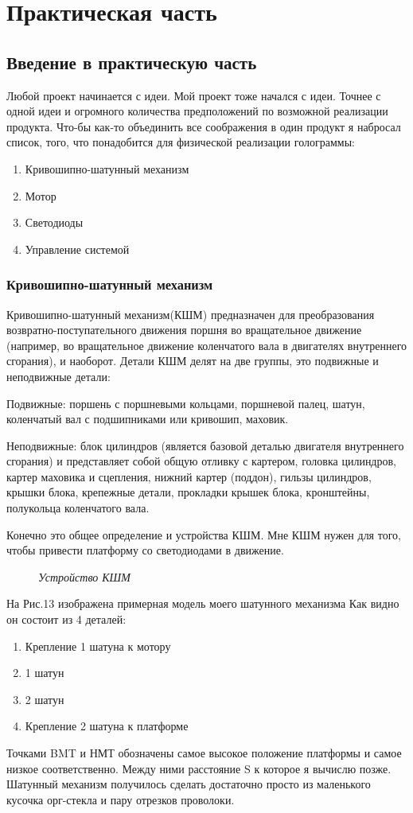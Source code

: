 \documentclass[a4paper, 12pt]{article}
\newcommand{\image}[3]{
	\begin{figure}[ht]
		\center{\texttt{[image: img/\#1]} }
		\caption{\textit{#3}}\end{figure}
}
\begin{document}
\newpage

\section{Практическая часть}
\subsection{Введение в практическую часть}

Любой проект начинается с идеи. Мой проект тоже начался с идеи.
Точнее с одной идеи и огромного количества предположений по возможной реализации продукта.
Что-бы как-то объединить все соображения в один продукт я набросал список, того,
что понадобится для физической реализации голограммы:
\begin{enumerate}
  \item Кривошипно-шатунный механизм
  \item Мотор
  \item Светодиоды
  \item Управление системой
\end{enumerate}
\subsubsection{Кривошипно-шатунный механизм}

Кривошипно-шатунный механизм(КШМ) предназначен для преобразования
возвратно-поступательного движения поршня во вращательное движение
(например, во вращательное движение коленчатого вала в двигателях
внутреннего сгорания), и наоборот. Детали КШМ делят на две
группы, это подвижные и неподвижные детали:

Подвижные: поршень с поршневыми кольцами, поршневой палец,
шатун, коленчатый вал с подшипниками или кривошип, маховик.

Неподвижные: блок цилиндров (является базовой деталью двигателя
внутреннего сгорания) и представляет собой общую отливку с картером,
головка цилиндров, картер маховика и сцепления, нижний картер (поддон),
гильзы цилиндров, крышки блока, крепежные детали, прокладки крышек
блока, кронштейны, полукольца коленчатого вала.

Конечно это общее определение и устройства КШМ. Мне КШМ нужен для того,
чтобы привести платформу со светодиодами в движение.

\image{Шатун.png}{350}{Устройство КШМ}

\newpage

На Рис.13 изображена примерная модель моего шатунного механизма
Как видно он состоит из 4 деталей:
\begin{enumerate}
  \item Крепление 1 шатуна к мотору
  \item 1 шатун
  \item 2 шатун
  \item Крепление 2 шатуна к платформе
\end{enumerate}
Точками BMT и НМТ обозначены самое высокое
положение платформы и самое низкое соответственно.
Между ними расстояние S к которое я вычислю позже.
Шатунный механизм получилось сделать достаточно просто
из маленького кусочка орг-стекла и пару отрезков проволоки.
\newpage
\end{document}
